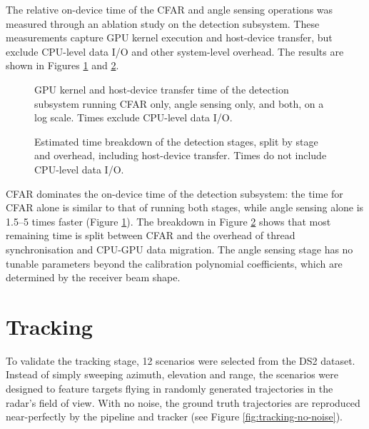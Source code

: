 The relative on-device time of the CFAR and angle sensing operations was measured
through an ablation study on the detection subsystem. These measurements capture GPU
kernel execution and host-device transfer, but exclude CPU-level data I/O and other
system-level overhead. The results are shown in Figures
\ref{fig:tracking-latency-trials} and \ref{fig:tracking-latency-breakdown}.
\begin{figure}
    
    \caption[Detection subsystem on-device time for CFAR, angle sensing, and both.]{GPU
    kernel and host-device transfer time of the detection subsystem running CFAR only,
    angle sensing only, and both, on a log scale. Times exclude CPU-level data I/O.}
    \label{fig:tracking-latency-trials}
\end{figure}
\begin{figure}
    
    \caption[On-device time breakdown from ablation study.]{Estimated time breakdown of
    the detection stages, split by stage and overhead, including host-device transfer.
    Times do not include CPU-level data I/O.}
    \label{fig:tracking-latency-breakdown}
\end{figure}
CFAR dominates the on-device time of the detection subsystem: the time for CFAR alone is
similar to that of running both stages, while angle sensing alone is 1.5--5 times faster
(Figure \ref{fig:tracking-latency-trials}). The breakdown in Figure
\ref{fig:tracking-latency-breakdown} shows that most remaining time is split between
CFAR and the overhead of thread synchronisation and CPU-GPU data migration. The angle
sensing stage has no tunable parameters beyond the calibration polynomial coefficients,
which are determined by the receiver beam shape.

\section{Tracking}
To validate the tracking stage, 12 scenarios were selected from the DS2 dataset.
Instead of simply sweeping azimuth, elevation and range, the scenarios were designed
to feature targets flying in randomly generated trajectories in the radar's field of view. 
With no noise, the ground truth trajectories are reproduced near-perfectly by the pipeline
and tracker (see Figure \ref{fig:tracking-no-noise}).

